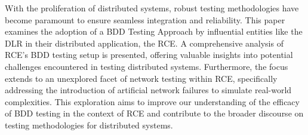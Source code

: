 With the proliferation of distributed systems, robust testing methodologies have become paramount to ensure seamless integration and reliability. This paper examines the adoption of a \ac{BDD} Testing Approach by influential entities like the \ac{DLR} in their distributed application, the \ac{RCE}. A comprehensive analysis of RCE's BDD testing setup is presented, offering valuable insights into potential challenges encountered in testing distributed systems. Furthermore, the focus extends to an unexplored facet of network testing within RCE, specifically addressing the introduction of artificial network failures to simulate real-world complexities. This exploration aims to improve our understanding of the efficacy of BDD testing in the context of RCE and contribute to the broader discourse on testing methodologies for distributed systems.